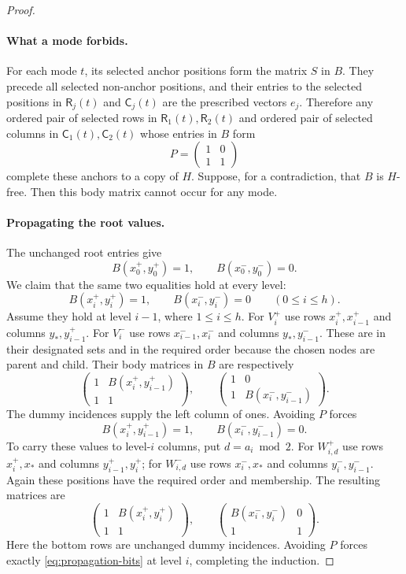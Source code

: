 \begin{proof}
\paragraph{What a mode forbids.}
For each mode $t$, its selected anchor positions form the matrix $S$
in $B$.  They precede all selected non-anchor positions, and their
entries to the selected positions in $\mathsf R_j(t)$ and
$\mathsf C_j(t)$ are the prescribed vectors $e_j$.
Therefore any ordered pair of selected rows in
$\mathsf R_1(t),\mathsf R_2(t)$ and ordered pair of selected columns in
$\mathsf C_1(t),\mathsf C_2(t)$ whose entries in $B$ form
\[
 P=\begin{pmatrix}1&0\\1&1\end{pmatrix}
\]
complete these anchors to a copy of $H$.
Suppose, for a contradiction, that $B$ is $H$-free.  Then this body
matrix cannot occur for any mode.

\paragraph{Propagating the root values.}
The unchanged root entries give
\begin{equation}\label{eq:root-bits}
 B(x_0^+,y_0^+)=1,\qquad B(x_0^-,y_0^-)=0.
\end{equation}
We claim that the same two equalities hold at every level:
\begin{equation}\label{eq:propagation-bits}
 B(x_i^+,y_i^+)=1,\qquad B(x_i^-,y_i^-)=0
 \qquad(0\leq i\leq h).
\end{equation}
Assume they hold at level $i-1$, where $1\leq i\leq h$.
For $V_i^+$ use rows $x_i^+,x_{i-1}^+$ and columns
$y_*,y_{i-1}^+$.  For $V_i^-$ use rows
$x_{i-1}^-,x_i^-$ and columns $y_*,y_{i-1}^-$.  These are in their
designated sets and in the required order because the chosen nodes are
parent and child.  Their body matrices in $B$ are respectively
\[
 \begin{pmatrix}
  1&B(x_i^+,y_{i-1}^+)\\1&1
 \end{pmatrix},\qquad
 \begin{pmatrix}
  1&0\\1&B(x_i^-,y_{i-1}^-)
 \end{pmatrix}.
\]
The dummy incidences supply the left column of ones.  Avoiding $P$
forces
\[
 B(x_i^+,y_{i-1}^+)=1,\qquad
 B(x_i^-,y_{i-1}^-)=0.
\]
To carry these values to level-$i$ columns, put $d=a_i\bmod 2$.
For $W_{i,d}^+$ use rows $x_i^+,x_*$ and columns
$y_{i-1}^+,y_i^+$; for $W_{i,d}^-$ use rows $x_i^-,x_*$ and columns
$y_i^-,y_{i-1}^-$.  Again these positions have the required order
and membership.  The resulting matrices are
\[
 \begin{pmatrix}
  1&B(x_i^+,y_i^+)\\1&1
 \end{pmatrix},\qquad
 \begin{pmatrix}
  B(x_i^-,y_i^-)&0\\1&1
 \end{pmatrix}.
\]
Here the bottom rows are unchanged dummy incidences.  Avoiding $P$
forces exactly \eqref{eq:propagation-bits} at level $i$, completing
the induction.


\end{proof}
